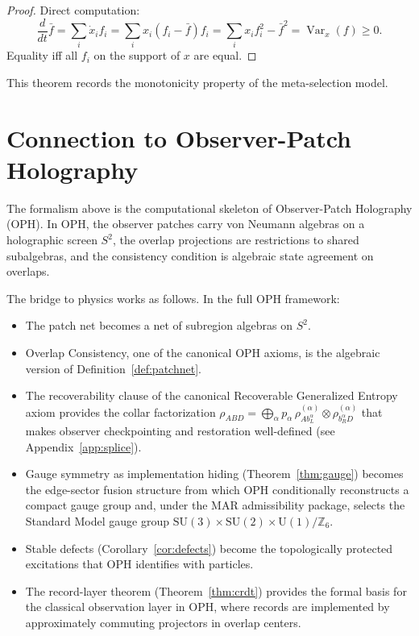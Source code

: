 \documentclass[11pt]{article}
\theoremstyle{remark}
\theoremstyle{plain}
\begin{document}
\begin{proof}
Direct computation:
\[
\frac{d}{dt}\bar{f}
=
\sum_i \dot{x}_i f_i
=
\sum_i x_i(f_i - \bar{f})f_i
=
\sum_i x_i f_i^2 - \bar{f}^2
=
\operatorname{Var}_x(f) \ge 0.
\]
Equality iff all $f_i$ on the support of $x$ are equal.
\end{proof}

This theorem records the monotonicity property of the meta-selection model.


\section{Connection to Observer-Patch Holography}

The formalism above is the computational skeleton of Observer-Patch Holography (OPH). In OPH, the observer patches carry von Neumann algebras on a holographic screen $S^2$, the overlap projections are restrictions to shared subalgebras, and the consistency condition is algebraic state agreement on overlaps.

The bridge to physics works as follows. In the full OPH framework:

\begin{itemize}
\item The patch net becomes a net of subregion algebras on $S^2$.
\item Overlap Consistency, one of the canonical OPH axioms, is the algebraic version of Definition~\ref{def:patchnet}.
\item The recoverability clause of the canonical Recoverable Generalized Entropy axiom provides the collar factorization $\rho_{ABD} = \bigoplus_\alpha p_\alpha\,\rho^{(\alpha)}_{Ab_L^\alpha}\otimes\rho^{(\alpha)}_{b_R^\alpha D}$ that makes observer checkpointing and restoration well-defined (see Appendix~\ref{app:splice}).
\item Gauge symmetry as implementation hiding (Theorem~\ref{thm:gauge}) becomes the edge-sector fusion structure from which OPH conditionally reconstructs a compact gauge group and, under the MAR admissibility package, selects the Standard Model gauge group $\mathrm{SU}(3)\times\mathrm{SU}(2)\times\mathrm{U}(1)/\mathbb{Z}_6$.
\item Stable defects (Corollary~\ref{cor:defects}) become the topologically protected excitations that OPH identifies with particles.
\item The record-layer theorem (Theorem~\ref{thm:crdt}) provides the formal basis for the classical observation layer in OPH, where records are implemented by approximately commuting projectors in overlap centers.
\end{itemize}
\end{document}
